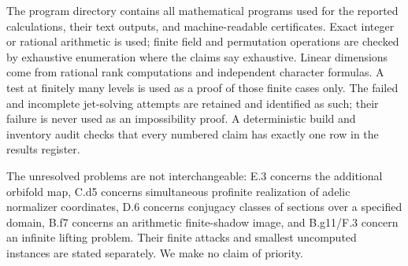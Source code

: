 The program directory contains all mathematical programs used for
the reported calculations, their text outputs, and machine-readable
certificates. Exact integer or rational arithmetic is used; finite
field and permutation operations are checked by exhaustive enumeration
where the claims say exhaustive. Linear dimensions come from rational
rank computations and independent character formulas. A test at
finitely many levels is used as a proof of those finite cases only.
The failed and incomplete jet-solving attempts are retained and
identified as such; their failure is never used as an impossibility
proof. A deterministic build and inventory audit checks that every
numbered claim has exactly one row in the results register.

The unresolved problems are not interchangeable: E.3 concerns the
additional orbifold map, C.d5 concerns simultaneous profinite
realization of adelic normalizer coordinates, D.6 concerns conjugacy
classes of sections over a specified domain, B.f7 concerns an
arithmetic finite-shadow image, and B.g11/F.3 concern an infinite
lifting problem. Their finite attacks and smallest uncomputed
instances are stated separately. We make no claim of priority.
